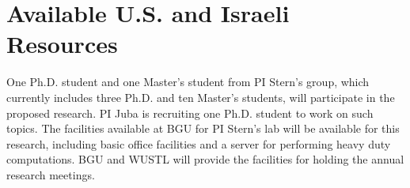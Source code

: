 \documentclass[12pt]{article}
\newcommand{\note}[1]{\textbf{\textit{#1}}}
\begin{document}
\section{Available U.S. and Israeli Resources}
One Ph.D. student and one Master’s student from PI Stern’s group, which currently includes three Ph.D. and ten Master's students, will participate in the proposed research. PI Juba is recruiting one Ph.D. student to work on such topics.
The facilities available at BGU for PI Stern’s
lab will be available for this research, including basic office facilities and a server for performing heavy duty computations. BGU and WUSTL will provide the facilities for holding the annual research meetings.




\pagebreak


\end{document}
